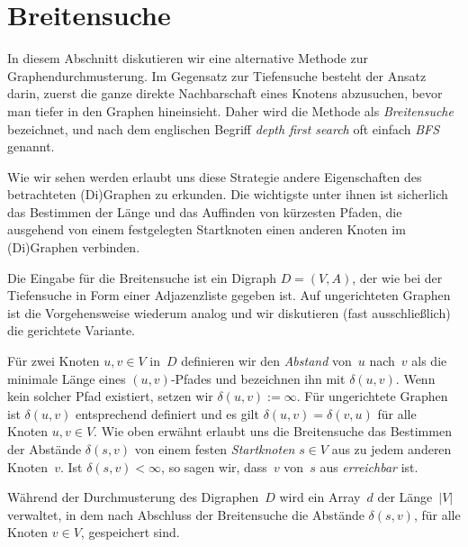 \section{Breitensuche}

\begin{bem}
In diesem Abschnitt diskutieren wir eine alternative Methode zur Graphendurchmusterung.
Im Gegensatz zur Tiefensuche besteht der Ansatz darin, zuerst die ganze direkte Nachbarschaft eines Knotens abzusuchen, bevor man tiefer in den Graphen hineinsieht.
Daher wird die Methode als \emph{Breitensuche} bezeichnet, und nach dem englischen Begriff \emph{depth first search} oft einfach \emph{BFS} genannt.

Wie wir sehen werden erlaubt uns diese Strategie andere Eigenschaften des betrachteten (Di)Graphen zu erkunden.
Die wichtigste unter ihnen ist sicherlich das Bestimmen der Länge und das Auffinden von kürzesten Pfaden, die ausgehend von einem festgelegten Startknoten einen anderen Knoten im (Di)Graphen verbinden.
\end{bem}

\begin{bem}
Die Eingabe für die Breitensuche ist ein Digraph $D=(V,A)$, der wie bei der Tiefensuche in Form einer Adjazenzliste gegeben ist.
Auf ungerichteten Graphen ist die Vorgehensweise wiederum analog und wir diskutieren (fast ausschließlich) die gerichtete Variante.
\end{bem}

\begin{defn}
Für zwei Knoten $u,v \in V$ in~$D$ definieren wir den \emph{Abstand} von~$u$ nach~$v$ als die minimale Länge eines $(u,v)$-Pfades und bezeichnen ihn mit $\delta(u,v)$.
Wenn kein solcher Pfad existiert, setzen wir $\delta(u,v):=\infty$.
Für ungerichtete Graphen ist $\delta(u,v)$ entsprechend definiert und es gilt $\delta(u,v)=\delta(v,u)$ für alle Knoten $u,v \in V$.
Wie oben erwähnt erlaubt uns die Breitensuche das Bestimmen der Abstände $\delta(s,v)$ von einem festen \emph{Startknoten} $s \in V$ aus zu jedem anderen Knoten~$v$.
Ist $\delta(s,v) < \infty$, so sagen wir, dass~$v$ von~$s$ aus \emph{erreichbar} ist.
\end{defn} 

\begin{bem} 
Während der Durchmusterung des Digraphen~$D$ wird ein Array~$d$ der Länge~$|V|$ verwaltet, in dem nach Abschluss der Breitensuche die Abstände $\delta(s,v)$, für alle Knoten $v \in V$, gespeichert sind.
\end{bem} 

